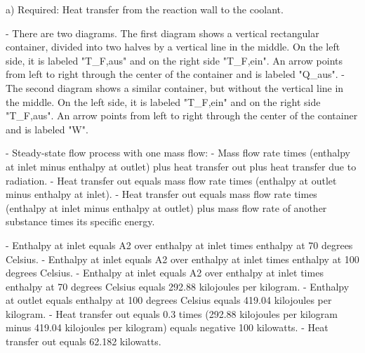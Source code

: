 a) Required: Heat transfer from the reaction wall to the coolant.

- There are two diagrams. The first diagram shows a vertical rectangular container, divided into two halves by a vertical line in the middle. On the left side, it is labeled "T_{F,aus}" and on the right side "T_{F,ein}". An arrow points from left to right through the center of the container and is labeled "Q_{aus}".
- The second diagram shows a similar container, but without the vertical line in the middle. On the left side, it is labeled "T_{F,ein}" and on the right side "T_{F,aus}". An arrow points from left to right through the center of the container and is labeled "W".

- Steady-state flow process with one mass flow:
  - Mass flow rate times (enthalpy at inlet minus enthalpy at outlet) plus heat transfer out plus heat transfer due to radiation.
  - Heat transfer out equals mass flow rate times (enthalpy at outlet minus enthalpy at inlet).
  - Heat transfer out equals mass flow rate times (enthalpy at inlet minus enthalpy at outlet) plus mass flow rate of another substance times its specific energy.

- Enthalpy at inlet equals A2 over enthalpy at inlet times enthalpy at 70 degrees Celsius.
- Enthalpy at inlet equals A2 over enthalpy at inlet times enthalpy at 100 degrees Celsius.
- Enthalpy at inlet equals A2 over enthalpy at inlet times enthalpy at 70 degrees Celsius equals 292.88 kilojoules per kilogram.
- Enthalpy at outlet equals enthalpy at 100 degrees Celsius equals 419.04 kilojoules per kilogram.
- Heat transfer out equals 0.3 times (292.88 kilojoules per kilogram minus 419.04 kilojoules per kilogram) equals negative 100 kilowatts.
- Heat transfer out equals 62.182 kilowatts.